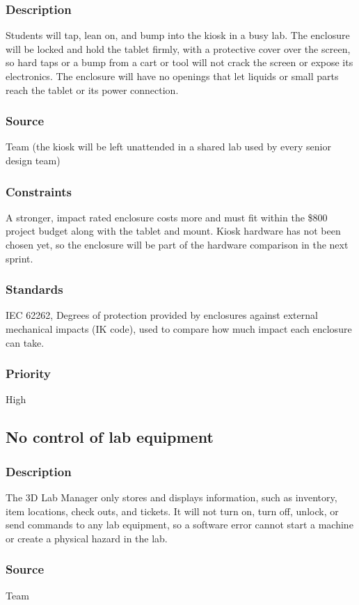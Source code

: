 \subsubsection{Description}
Students will tap, lean on, and bump into the kiosk in a busy lab. The enclosure will be locked and hold the tablet firmly, with a protective cover over the screen, so hard taps or a bump from a cart or tool will not crack the screen or expose its electronics. The enclosure will have no openings that let liquids or small parts reach the tablet or its power connection.
\subsubsection{Source}
Team (the kiosk will be left unattended in a shared lab used by every senior design team)
\subsubsection{Constraints}
A stronger, impact rated enclosure costs more and must fit within the \$800 project budget along with the tablet and mount. Kiosk hardware has not been chosen yet, so the enclosure will be part of the hardware comparison in the next sprint.
\subsubsection{Standards}
IEC 62262, Degrees of protection provided by enclosures against external mechanical impacts (IK code), used to compare how much impact each enclosure can take.
\subsubsection{Priority}
High

\subsection{No control of lab equipment}
\subsubsection{Description}
The 3D Lab Manager only stores and displays information, such as inventory, item locations, check outs, and tickets. It will not turn on, turn off, unlock, or send commands to any lab equipment, so a software error cannot start a machine or create a physical hazard in the lab.
\subsubsection{Source}
Team
